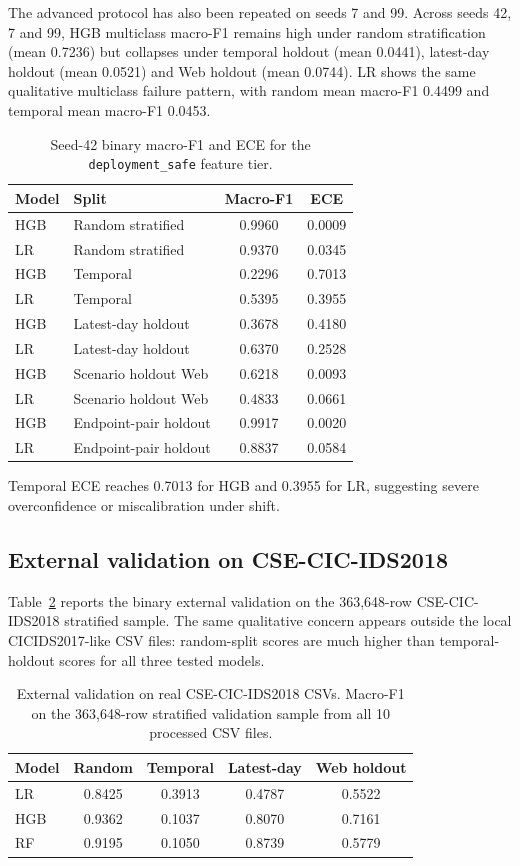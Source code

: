 \documentclass[11pt,a4paper]{article}
\begin{document}
The advanced protocol has also been repeated on seeds 7 and 99. Across seeds 42, 7 and 99, HGB multiclass macro-F1 remains high under random stratification (mean 0.7236) but collapses under temporal holdout (mean 0.0441), latest-day holdout (mean 0.0521) and Web holdout (mean 0.0744). LR shows the same qualitative multiclass failure pattern, with random mean macro-F1 0.4499 and temporal mean macro-F1 0.0453.

\begin{table}[ht]
\centering
\caption{Seed-42 binary macro-F1 and ECE for the \texttt{deployment\_safe} feature tier.}
\label{tab:binary-calibration}
\begin{tabular}{llcc}
\toprule
Model & Split & Macro-F1 & ECE \\
\midrule
HGB & Random stratified & 0.9960 & 0.0009 \\
LR & Random stratified & 0.9370 & 0.0345 \\
HGB & Temporal & 0.2296 & 0.7013 \\
LR & Temporal & 0.5395 & 0.3955 \\
HGB & Latest-day holdout & 0.3678 & 0.4180 \\
LR & Latest-day holdout & 0.6370 & 0.2528 \\
HGB & Scenario holdout Web & 0.6218 & 0.0093 \\
LR & Scenario holdout Web & 0.4833 & 0.0661 \\
HGB & Endpoint-pair holdout & 0.9917 & 0.0020 \\
LR & Endpoint-pair holdout & 0.8837 & 0.0584 \\
\bottomrule
\end{tabular}
\end{table}

Temporal ECE reaches 0.7013 for HGB and 0.3955 for LR, suggesting severe overconfidence or miscalibration under shift.

\subsection{External validation on CSE-CIC-IDS2018}

Table~\ref{tab:external-cse} reports the binary external validation on the 363,648-row CSE-CIC-IDS2018 stratified sample. The same qualitative concern appears outside the local CICIDS2017-like CSV files: random-split scores are much higher than temporal-holdout scores for all three tested models.

\begin{table}[ht]
\centering
\caption{External validation on real CSE-CIC-IDS2018 CSVs. Macro-F1 on the 363,648-row stratified validation sample from all 10 processed CSV files.}
\label{tab:external-cse}
\begin{tabular}{lcccc}
\toprule
Model & Random & Temporal & Latest-day & Web holdout \\
\midrule
LR & 0.8425 & 0.3913 & 0.4787 & 0.5522 \\
HGB & 0.9362 & 0.1037 & 0.8070 & 0.7161 \\
RF & 0.9195 & 0.1050 & 0.8739 & 0.5779 \\
\bottomrule
\end{tabular}
\end{table}
\end{document}
